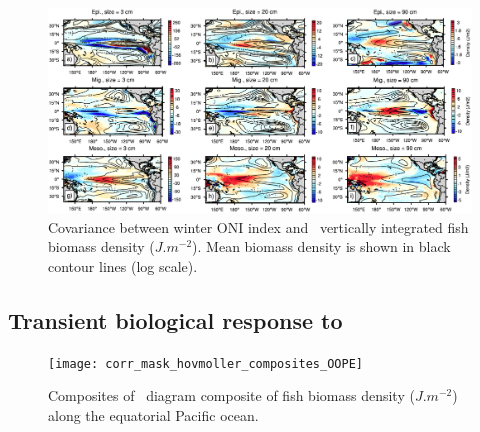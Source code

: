 \begin{figure}[h!]
    \centering
    \includegraphics[width=\textwidth] {figs/covariance_maps_OOPE.pdf}
    \caption{Covariance between winter ONI index and \ap\ vertically integrated fish biomass density ($J.m^{-2}$). Mean biomass density is shown in black contour lines (log scale).}
    \label{fig:cov-ape}
\end{figure}

\subsection{Transient biological response to \nino}

\begin{figure}[h!]
    \centering
    \texttt{[image: corr\_mask\_hovmoller\_composites\_OOPE]}
    \caption{Composites of \hov\ diagram composite of fish biomass density ($J.m^{-2}$) along the equatorial Pacific ocean.}
    \label{fig:hov-oope}
\end{figure}

\clearpage
